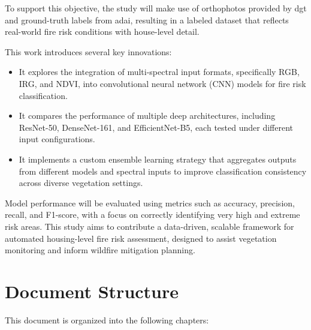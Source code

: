 To support this objective, the study will make use of orthophotos provided by \gls{dgt} and ground-truth labels 
from \gls{adai}, resulting in a labeled dataset that reflects real-world fire risk conditions with house-level detail.

This work introduces several key innovations:
\begin{itemize}
    \item It explores the integration of multi-spectral input formats, specifically RGB, IRG, and NDVI, into convolutional neural network (CNN) models for fire risk classification.
    \item It compares the performance of multiple deep architectures, including ResNet-50, DenseNet-161, and EfficientNet-B5, each tested under different input configurations.
    \item It implements a custom ensemble learning strategy that aggregates outputs from different models and spectral inputs to improve classification consistency across diverse vegetation settings.
\end{itemize}

Model performance will be evaluated using metrics such as accuracy, precision, recall, and F1-score, with a focus 
on correctly identifying very high and extreme risk areas. This study aims to contribute a data-driven, scalable 
framework for automated housing-level fire risk assessment, 
designed to assist vegetation monitoring and inform wildfire mitigation planning.


\section{Document Structure}

This document is organized into the following chapters:

